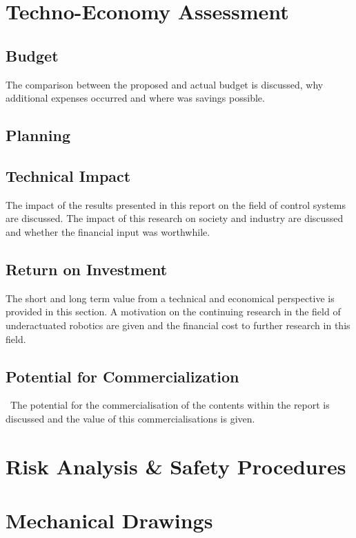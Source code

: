 \newpage



%

\section{Techno-Economy Assessment}

\subsection{Budget}
The comparison between the proposed and actual budget is discussed, why additional expenses occurred and where was savings possible.  


\subsection{Planning}
\subsection{Technical Impact}
The impact of the results presented in this report on the field of control systems are discussed. The impact of this research on society and industry are discussed and whether the financial input was worthwhile.\\


\subsection{Return on Investment}
The short and long term value from a technical and economical perspective is provided in this section. A motivation on the continuing research in the field of underactuated robotics are given and the financial cost to further research in this field.\\


\subsection{Potential for Commercialization}\
The potential for the commercialisation of the contents within the report is discussed and the value of this commercialisations is given. 




\section{Risk Analysis \& Safety Procedures}

\section{Mechanical Drawings}



\endinput
